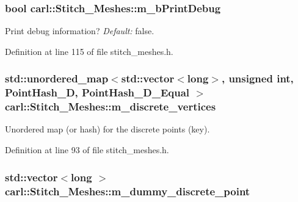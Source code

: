 \subsubsection[{m\+\_\+b\+Print\+Debug}]{\setlength{\rightskip}{0pt plus 5cm}bool carl\+::\+Stitch\+\_\+\+Meshes\+::m\+\_\+b\+Print\+Debug\hspace{0.3cm}{\ttfamily [protected]}}\label{classcarl_1_1_stitch___meshes_aeb94b2d2b28624414fd00e02ec9a97e0}


Print debug information? {\itshape Default\+:} false. 



Definition at line 115 of file stitch\+\_\+meshes.\+h.

\hypertarget{classcarl_1_1_stitch___meshes_a3fa40b0605f44524589a60be157a8a87}{}
\subsubsection[{m\+\_\+discrete\+\_\+vertices}]{\setlength{\rightskip}{0pt plus 5cm}std\+::unordered\+\_\+map$<$std\+::vector$<$long$>$, unsigned int, {\bf Point\+Hash\+\_\+D}, {\bf Point\+Hash\+\_\+D\+\_\+\+Equal} $>$ carl\+::\+Stitch\+\_\+\+Meshes\+::m\+\_\+discrete\+\_\+vertices\hspace{0.3cm}{\ttfamily [protected]}}\label{classcarl_1_1_stitch___meshes_a3fa40b0605f44524589a60be157a8a87}


Unordered map (or hash) for the discrete points (key). 



Definition at line 93 of file stitch\+\_\+meshes.\+h.

\hypertarget{classcarl_1_1_stitch___meshes_a254b2b118a6bcabe7ebeeee083f03a9a}{}
\subsubsection[{m\+\_\+dummy\+\_\+discrete\+\_\+point}]{\setlength{\rightskip}{0pt plus 5cm}std\+::vector$<$long $>$ carl\+::\+Stitch\+\_\+\+Meshes\+::m\+\_\+dummy\+\_\+discrete\+\_\+point\hspace{0.3cm}{\ttfamily [protected]}}\label{classcarl_1_1_stitch___meshes_a254b2b118a6bcabe7ebeeee083f03a9a}


